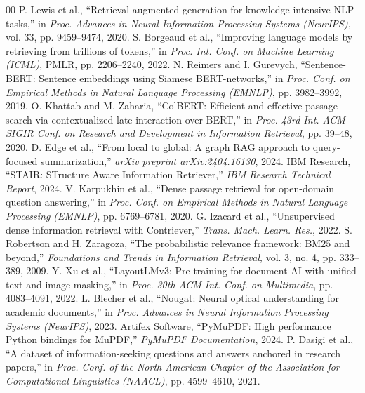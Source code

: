 \documentclass[conference]{IEEEtran}
\begin{document}

\begin{thebibliography}{00}
 P. Lewis et al., ``Retrieval-augmented generation for knowledge-intensive NLP tasks,'' in \textit{Proc. Advances in Neural Information Processing Systems (NeurIPS)}, vol. 33, pp. 9459--9474, 2020.
 S. Borgeaud et al., ``Improving language models by retrieving from trillions of tokens,'' in \textit{Proc. Int. Conf. on Machine Learning (ICML)}, PMLR, pp. 2206--2240, 2022.
 N. Reimers and I. Gurevych, ``Sentence-BERT: Sentence embeddings using Siamese BERT-networks,'' in \textit{Proc. Conf. on Empirical Methods in Natural Language Processing (EMNLP)}, pp. 3982--3992, 2019.
 O. Khattab and M. Zaharia, ``ColBERT: Efficient and effective passage search via contextualized late interaction over BERT,'' in \textit{Proc. 43rd Int. ACM SIGIR Conf. on Research and Development in Information Retrieval}, pp. 39--48, 2020.
 D. Edge et al., ``From local to global: A graph RAG approach to query-focused summarization,'' \textit{arXiv preprint arXiv:2404.16130}, 2024.
 IBM Research, ``STAIR: STructure Aware Information Retriever,'' \textit{IBM Research Technical Report}, 2024.
 V. Karpukhin et al., ``Dense passage retrieval for open-domain question answering,'' in \textit{Proc. Conf. on Empirical Methods in Natural Language Processing (EMNLP)}, pp. 6769--6781, 2020.
 G. Izacard et al., ``Unsupervised dense information retrieval with Contriever,'' \textit{Trans. Mach. Learn. Res.}, 2022.
 S. Robertson and H. Zaragoza, ``The probabilistic relevance framework: BM25 and beyond,'' \textit{Foundations and Trends in Information Retrieval}, vol. 3, no. 4, pp. 333--389, 2009.
 Y. Xu et al., ``LayoutLMv3: Pre-training for document AI with unified text and image masking,'' in \textit{Proc. 30th ACM Int. Conf. on Multimedia}, pp. 4083--4091, 2022.
 L. Blecher et al., ``Nougat: Neural optical understanding for academic documents,'' in \textit{Proc. Advances in Neural Information Processing Systems (NeurIPS)}, 2023.
 Artifex Software, ``PyMuPDF: High performance Python bindings for MuPDF,'' \textit{PyMuPDF Documentation}, 2024.
 P. Dasigi et al., ``A dataset of information-seeking questions and answers anchored in research papers,'' in \textit{Proc. Conf. of the North American Chapter of the Association for Computational Linguistics (NAACL)}, pp. 4599--4610, 2021.
\end{thebibliography}
\end{document}

